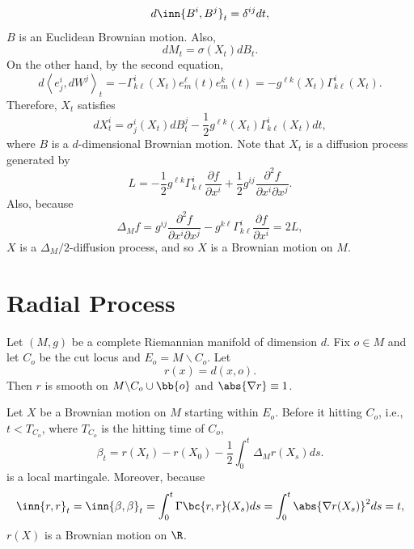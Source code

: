 \begin{exam}
\begin{equation*}
        d\inn{B^i,B^j}_t = \delta^{ij}dt,
    \end{equation*}
    $B$ is an Euclidean Brownian motion. Also,
    \begin{equation*}
        dM_t = \sigma(X_t)dB_t.
    \end{equation*}
    On the other hand, by the second equation,
    \begin{equation*}
        d\left\langle e_j^i, d W^j\right\rangle_t=-\Gamma_{k\ell}^i\left(X_t\right) e_m^\ell(t) e_m^k(t)=-g^{\ell k}\left(X_t\right) \Gamma_{k\ell}^i\left(X_t\right) .
    \end{equation*}
    Therefore, $X_t$ satisfies
    \begin{equation*}
        d X_t^i=\sigma_j^i\left(X_t\right) d B_t^j-\frac{1}{2} g^{\ell k}\left(X_t\right) \Gamma_{k \ell}^i\left(X_t\right) d t,
    \end{equation*}
    where $B$ is a $d$-dimensional Brownian motion. Note that $X_t$ is a diffusion process generated by
    \begin{equation*}
        L = -\frac{1}{2} g^{\ell k} \Gamma_{k \ell}^i\frac{\partial f}{\partial x^i} + \frac{1}{2} g^{ij}\frac{\partial^2 f}{\partial x^i \partial x^j}.
    \end{equation*}
    Also, because
    \begin{equation*}
        \Delta_M f = g^{ij}\frac{\partial^2 f}{\partial x^i \partial x^j} - g^{k\ell} \Gamma^i_{k\ell}\frac{\partial f}{\partial x^i} = 2L,
    \end{equation*}
    $X$ is a $\Delta_M / 2$-diffusion process, and so $X$ is a Brownian motion on $M$.
\end{exam}

\section{Radial Process}

Let $(M,g)$ be a complete Riemannian manifold of dimension $d$. Fix $o \in M$ and let $C_o$ be the cut locus and $E_o = M \backslash C_o$. Let
\begin{equation*}
    r(x) = d(x,o).
\end{equation*}
Then $r$ is smooth on $M \backslash C_o \cup \bb{o}$ and $\abs{\nabla r} \equiv 1$.

Let $X$ be a Brownian motion on $M$ starting within $E_o$. Before it hitting $C_o$, i.e., $t < T_{C_o}$, where $T_{C_o}$ is the hitting time of $C_o$, 
\begin{equation*}
    \beta_t = r(X_t) - r(X_0) - \frac{1}{2}\int_0^t \Delta_Mr(X_s)ds.
\end{equation*}
is a local martingale. Moreover, because
\begin{equation*}
    \inn{r,r}_t = \inn{\beta,\beta}_t = \int_0^t \Gamma\bc{r,r}(X_s)ds = \int_0^t \abs{\nabla r (X_s)}^2 ds = t,
\end{equation*}
$r(X)$ is a Brownian motion on $\R$.


